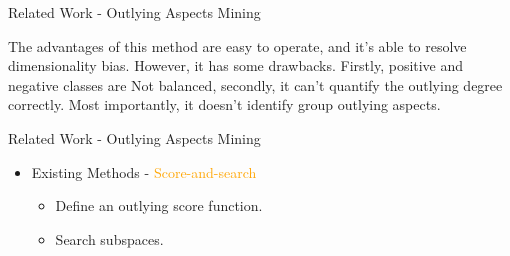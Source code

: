\documentclass[
size=14pt,
paper=smartboard,  %
mode=present, 		%
display=slides, 	%
style=tuliplab,  	%
pauseslide,
fleqn,leqno]{powerdot}
\begin{document}
\begin{slide}{Related Work - Outlying Aspects Mining}
\begin{note}
			The advantages of this method are easy to operate,
			and it's able to resolve dimensionality bias.
			However, it has some drawbacks.
			Firstly,
			positive and negative classes are Not balanced,
			secondly,
			it can't quantify the outlying degree correctly.
			Most importantly,
			it doesn't identify group outlying aspects.
		\end{note}
		
	\end{slide}
	
	
	\begin{slide}[toc=,bm=]{Related Work - Outlying Aspects Mining}
		
		\begin{itemize}
			\item
			Existing Methods - \textcolor{orange} {Score-and-search}
			
			\begin{itemize}
				\item
				Define an outlying score function.
				
				\item
				Search subspaces.
			\end{itemize}
			\bigskip
\end{itemize}
\end{slide}
\end{document}
